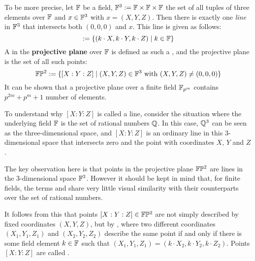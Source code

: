 To be more precise, let $\mathbb{F}$ be a field, $\mathbb{F}^3:=\mathbb{F}\times \mathbb{F}\times \mathbb{F}$ the set of all tuples of three elements over $\mathbb{F}$ and $x\in \mathbb{F}^3$ with $x=(X,Y,Z)$. Then there is exactly one \textit{line} in $\mathbb{F}^3$ that intersects both $(0,0,0)$ and $x$. This line is given as follows:
\begin{equation}
[X:Y:Z] := \{(k\cdot X,k\cdot Y, k\cdot Z)\;|\; k\in\F\}
\end{equation}
A  in the \textbf{projective plane} over $\mathbb{F}$ is defined as such a , and the projective plane is the set of all such points:
\begin{equation}
\mathbb{F}\mathbb{P}^2:=\{[X:Y:Z]\;|\; (X,Y,Z)\in \mathbb{F}^3\text{ with } (X,Y,Z)\neq (0,0,0)\}
\end{equation}
It can be shown that a projective plane over a finite field $\mathbb{F}_{p^m}$ contains $p^{2m}+p^m+1$ number of elements.

To understand why $[X:Y:Z]$ is called a line, consider the situation where the underlying field $\mathbb{F}$ is the set of rational numbers $\mathbb{Q}$. In this case, $\mathbb{Q}^3$ can be seen as the three-dimensional space, and $[X:Y:Z]$ is  an ordinary line in this 3-dimensional space that intersects zero and the point with coordinates $X$, $Y$ and $Z$.

The key observation here is that points in the projective plane $\mathbb{F}\mathbb{P}^2$ are lines in the $3$-dimensional space $\mathbb{F}^3$. However it should be kept in mind that, for finite fields, the terms  and  share very little visual similarity with their counterparts over the set of rational numbers.

It follows from this that points $[X:Y:Z]\in \mathbb{F}\mathbb{P}^2$ are not simply described by fixed coordinates $(X,Y,Z)$, but by , where two different coordinates $(X_1,Y_1,Z_1)$ and $(X_2,Y_2,Z_2)$ describe the same point if and only if there is some field element $k\in\mathbb{F}$ such that $(X_1,Y_1,Z_1) = (k\cdot X_2,k\cdot Y_2,k\cdot Z_2)$. Points $[X:Y:Z]$ are called .

